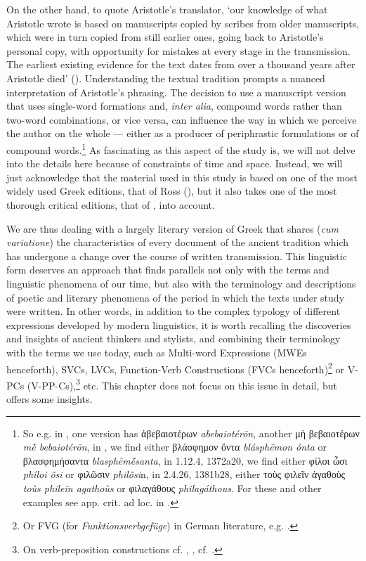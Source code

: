 \documentclass[output=paper,colorlinks,citecolor=brown]{langscibook}
\begin{document}
On the other hand, to quote Aristotle’s translator, ‘our knowledge of what Aristotle wrote is based on manuscripts copied by scribes from older manuscripts, which were in turn copied from still earlier ones, going back to Aristotle’s personal copy, with opportunity for mistakes at every stage in the transmission. The earliest existing evidence for the text dates from over a thousand years after Aristotle died' (\citealt[xii]{Kennedy2007}). Understanding the textual tradition prompts a nuanced interpretation of Aristotle’s phrasing. The decision to use a manuscript version that uses single-word formations and, \textit{inter alia}, compound words rather than two-word combinations, or vice versa, can influence the way in which we perceive the author on the whole — either as a producer of periphrastic formulations or of compound words.\footnote{So e.g. in , one version has ἀβεβαιοτέρων \textit{abebaiotérōn}, another μὴ βεβαιοτέρων \textit{mḕ bebaiotérōn}, in , we find either βλάσφημον ὄντα \textit{blásphēmon ónta} or βλασφημήσαντα \textit{blasphēmḗsanta}, in 1.12.4, 1372a20, we find either φίλοι ὦσι \textit{phíloi ō̃si} or φιλῶσιν \textit{philō̃si}n, in 2.4.26, 1381b28, either τοὺς φιλεῖν ἀγαθοὺς \textit{toùs phileĩn agathoùs} or φιλαγάθους \textit{philagáthous}. For these and other examples see app. crit. ad loc. in \citet{Kassel1976}.} As fascinating as this aspect of the study is, we will not delve into the details here because of constraints of time and space. Instead, we will just acknowledge that the material used in this study is based on one of the most widely used Greek editions, that of Ross (\citealt{Ross1959}), but it also takes one of the most thorough critical editions, that of \citet{Kassel1976}, into account.

\largerpage%
We are thus dealing with a largely literary version of Greek that shares (\textit{cum variatione}) the characteristics of every document of the ancient tradition which has undergone a change over the course of written transmission. This linguistic form deserves an approach that finds parallels not only with the terms and linguistic phenomena of our time, but also with the terminology and descriptions of poetic and literary phenomena of the period in which the texts under study were written. In other words, in addition to the complex typology of different expressions developed by modern linguistics, it is worth recalling the discoveries and insights of ancient thinkers and stylists, and combining their terminology with the terms we use today, such as Multi-word Expressions (MWEs henceforth), SVCs, LVCs, Function-Verb Constructions (FVCs henceforth)\footnote{Or FVG (for \textit{Funktionsverbgefüge}) in German literature, e.g. \citet{Schutzeichel2014}.} or V-PCs (V-PP-Cs),\footnote{On verb-preposition constructions cf. \citet{Farrell2005}, \citet{Keizer2009}, cf. \citet[8]{Langer2004}.} etc. This chapter does not focus on this issue in detail, but offers some insights.
\end{document}

